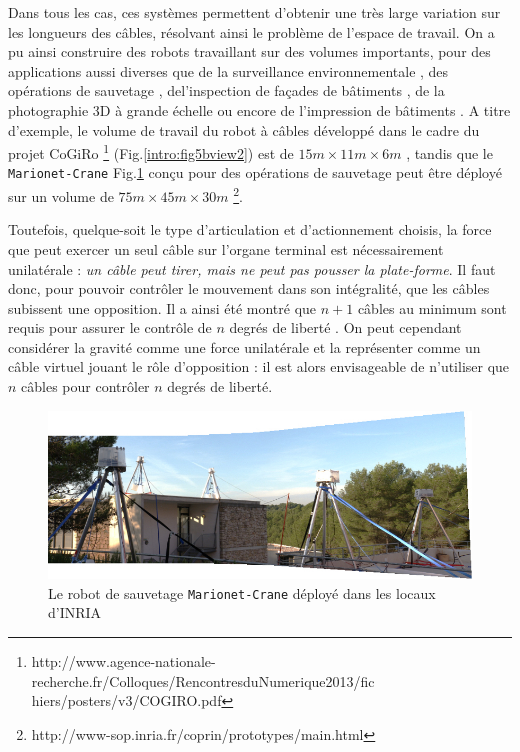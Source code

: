 Dans tous les cas, ces systèmes permettent d'obtenir une très large variation 
sur les longueurs des câbles, r\'esolvant ainsi le problème de l'espace de 
travail. On a pu ainsi construire des robots travaillant sur des volumes 
importants, pour des applications aussi diverses que de la surveillance 
environnementale \cite{jordan2007}\cite{borgstrom2009}, des op\'erations de 
sauvetage \cite{merlet2010}\cite{satoshi2002}\cite{bosscher2005}, 
del'inspection de fa\c cades de b\^atiments \cite{izard2013}, de la photographie 
3D \`a grande échelle \cite{deschenes2007} ou encore de l'impression de 
b\^atiments \cite{bosscher2007cc}. A titre d'exemple, le volume de travail du 
robot \`a c\^ables d\'evelopp\'e dans le cadre du projet CoGiRo \footnote{
http://www.agence-nationale-recherche.fr/Colloques/RencontresduNumerique2013/fic
hiers/posters/v3/COGIRO.pdf} (Fig.\ref{intro:fig5bview2}) est de $15m \times 
11m\times 6m$ \cite{sandretto2015}, tandis que le {\tt Marionet-Crane} 
Fig.\ref{intro:fig4b} con\c cu pour des opérations de sauvetage peut \^etre 
d\'eploy\'e sur un volume de $75m\times45m\times30m$ 
\footnote{http://www-sop.inria.fr/coprin/prototypes/main.html}.

Toutefois, quelque-soit le type d'articulation et d'actionnement choisis, la 
force que peut exercer un seul câble sur l'organe terminal est nécessairement 
unilatérale : {\em un câble peut tirer, mais ne peut pas pousser la 
plate-forme}. Il faut donc, pour pouvoir contrôler le mouvement dans son 
intégralité, que les câbles subissent une opposition. Il a ainsi été montré que 
$n+1$ câbles au minimum sont requis pour assurer le contrôle de $n$ degrés de 
liberté \cite{1994:Ming.Higuchi}. On peut cependant considérer la gravité comme 
une force unilatérale et la représenter comme un câble virtuel jouant le rôle 
d'opposition : il est alors envisageable de n'utiliser que $n$ câbles pour 
contr\^oler $n$ degrés de liberté.

\begin{figure}[!ht]
  \centering
\includegraphics[width=.98\linewidth]{./chapter0/figures/marionet_crane.jpg}
    \caption{\footnotesize Le robot de sauvetage {\tt Marionet-Crane} 
d\'eploy\'e dans les locaux d'INRIA}
\label{intro:fig4b}
\end{figure}

